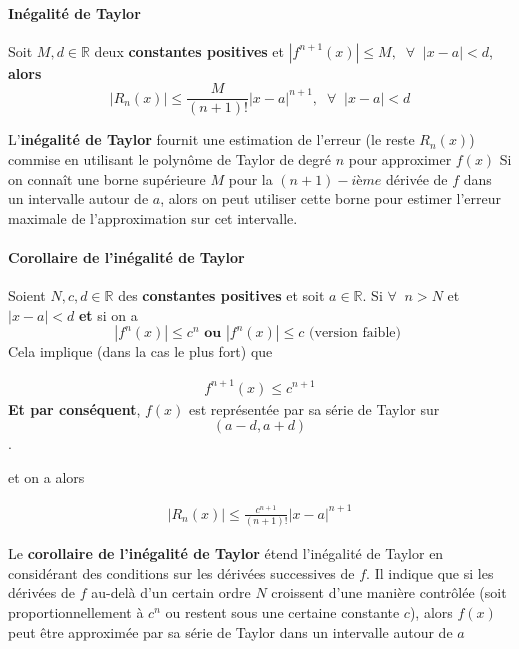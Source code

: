 \documentclass{report}
\begin{document}
\begin{multicols*}{3}
  \paragraph{Inégalité de Taylor}
  Soit $M, d \in \mathbb{R}$ deux 
  \textbf{constantes positives}  
  et $|f^{n+1}(x)| \leq M, \;\; \forall \;\; |x - a| < d$, 
  \textbf{alors}
  \[ 
    |R_n(x)| \leq \frac{M}{(n+1)!}|x - a|^{n+1}, \;\; 
        \forall \;\; |x - a | < d 
  \]

  L'\textbf{inégalité de Taylor} fournit une 
  estimation de l'erreur (le reste $R_n(x)$)
  commise en utilisant le polynôme de Taylor de 
  degré $n$ pour approximer $f(x)$  
  Si on connaît une borne supérieure 
  $M$ pour la $(n+1)-ième $ dérivée de 
  $f$ dans un intervalle autour de 
  $a$, alors on peut utiliser cette borne pour 
  estimer l'erreur maximale de l'approximation 
  sur cet intervalle.

  \paragraph{Corollaire de l'inégalité de Taylor}
  Soient $N, c, d \in \mathbb{R}$ des 
  \textbf{constantes positives}   
  et soit $a \in \mathbb{R}$. Si 
  $\forall \;\; n > N$ et $|x - a | < d$ 
  \textbf{et}  si on a  
  \[ |f^{n}(x)| \leq c^n \textbf{  ou } 
  |f^{n}(x)| \leq c \text{ (version faible) } \]
  Cela implique (dans la cas le plus fort) que 

  \begin{align*}
      f^{n+1}(x) \leq c^{n+1}
  \end{align*}
  \textbf{Et par conséquent}, $f(x)$ est 
  représentée par sa série de 
  Taylor sur $$(a - d, a + d)$$. 

  et on a alors 

  \begin{align*}
    |R_n(x)| \leq \frac{c^{n+1}}{(n+1)!} 
          \left|x - a \right|^{n+1}
  \end{align*}

  Le \textbf{ corollaire de l'inégalité de Taylor}
  étend l'inégalité de Taylor en considérant 
  des conditions sur les dérivées successives de 
  $f$. Il indique que si les dérivées de 
  $f$ au-delà d'un certain ordre $N$ croissent 
  d'une manière contrôlée 
  (soit proportionnellement à $c^n$
  ou restent sous une certaine constante 
  $c$), alors $f(x)$ peut être approximée par 
  sa série de Taylor dans un intervalle autour de 
  $a$




  











     











 \end{multicols*}
\end{document}
